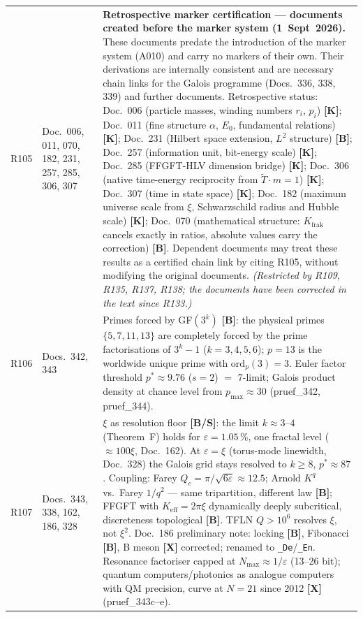 \begin{longtable}{@{}p{0.9cm}p{3.1cm}p{10.2cm}@{}}
R105 & Doc.~006, 011, 070, 182, 231, 257, 285, 306, 307 & \textbf{Retrospective marker certification — documents created before the marker system (1~Sept~2026).} These documents predate the introduction of the marker system (A010) and carry no markers of their own. Their derivations are internally consistent and are necessary chain links for the Galois programme (Docs.~336, 338, 339) and further documents. Retrospective status: Doc.~006 (particle masses, winding numbers $r_i$, $p_i$) \textbf{[K]}; Doc.~011 (fine structure $\alpha$, $E_0$, fundamental relations) \textbf{[K]}; Doc.~231 (Hilbert space extension, $L^2$ structure) \textbf{[B]}; Doc.~257 (information unit, bit-energy scale) \textbf{[K]}; Doc.~285 (FFGFT-HLV dimension bridge) \textbf{[K]}; Doc.~306 (native time-energy reciprocity from $\tilde{T}\cdot m=1$) \textbf{[K]}; Doc.~307 (time in state space) \textbf{[K]}; Doc.~182 (maximum universe scale from $\xi$, Schwarzschild radius and Hubble scale) \textbf{[K]}; Doc.~070 (mathematical structure: $K_\text{frak}$ cancels exactly in ratios, absolute values carry the correction) \textbf{[B]}. Dependent documents may treat these results as a certified chain link by citing R105, without modifying the original documents. \emph{(Restricted by R109, R135, R137, R138; the documents have been corrected in the text since R133.)} \\
R106 & Docs.~342, 343 & Primes forced by GF$(3^k)$ \textbf{[B]}: the physical primes $\{5,7,11,13\}$ are completely forced by the prime factorisations of $3^k-1$ ($k=3,4,5,6$); $p=13$ is the worldwide unique prime with $\text{ord}_p(3)=3$. Euler factor threshold $p^*\approx9.76$ ($s=2$) $=$ 7-limit; Galois product density at chance level from $p_\text{max}\approx30$ (pruef\_342, pruef\_344). \\
R107 & Docs.~343, 338, 162, 186, 328 & $\xi$ as resolution floor \textbf{[B/S]}: the limit $k\approx3$--$4$ (Theorem~F) holds for $\varepsilon=1.05\,\%$, one fractal level ($\approx100\xi$, Doc.~162). At $\varepsilon=\xi$ (torus-mode linewidth, Doc.~328) the Galois grid stays resolved to $k\geq8$, $p^*\approx87$. Coupling: Farey $Q_c=\pi/\sqrt{6\varepsilon}\approx12.5$; Arnold $K^q$ vs.\ Farey $1/q^2$ --- same tripartition, different law \textbf{[B]}; FFGFT with $K_\text{eff}=2\pi\xi$ dynamically deeply subcritical, discreteness topological \textbf{[B]}. TFLN $Q>10^6$ resolves $\xi$, not $\xi^2$. Doc.~186 preliminary note: locking \textbf{[B]}, Fibonacci \textbf{[B]}, B meson \textbf{[X]} corrected; renamed to \texttt{\_De}/\texttt{\_En}. Resonance factoriser capped at $N_\text{max}\approx1/\varepsilon$ (13--26 bit); quantum computers/photonics as analogue computers with QM precision, curve at $N=21$ since 2012 \textbf{[X]} (pruef\_343c--e). \\

\end{longtable}
